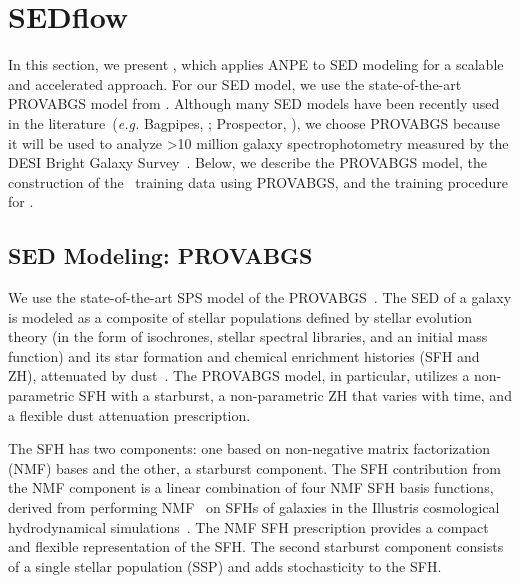 \section{SEDflow} \label{sec:sedflow}
In this section, we present \sedflow, which applies ANPE to SED modeling for a
scalable and accelerated approach.
For our SED model, we use the state-of-the-art PROVABGS model from
\cite{hahn2022}. 
Although many SED models have been recently used in the
literature~(\emph{e.g.} {\sc Bagpipes}, \citealt{carnall2018}; 
{\sc Prospector}, \citealt{leja2017, johnson2021}), we choose PROVABGS because
it will be used to analyze >10 million galaxy spectrophotometry measured by the
DESI Bright Galaxy Survey~\citep{ruiz-macias2021, hahn2022}.
Below, we describe the PROVABGS model, the construction of the
\sedflow~training data using PROVABGS, and the training procedure for \sedflow.

\subsection{SED Modeling: PROVABGS} \label{sec:provabgs}
We use the state-of-the-art SPS model of the
PROVABGS~\citep{hahn2022}. 
The SED of a galaxy is modeled as a composite of stellar populations defined by
stellar evolution theory (in the form of isochrones, stellar spectral
libraries, and an initial mass function) and its star
formation and chemical enrichment histories (SFH and ZH), attenuated by
dust~\citep[see][for a review]{walcher2011, conroy2013}. 
The PROVABGS model, in particular, utilizes a non-parametric SFH with a
starburst, a non-parametric ZH that varies with time, and a flexible dust
attenuation prescription.

The SFH has two components: one based on non-negative matrix factorization
(NMF) bases and the other, a starburst component.
The SFH contribution from the NMF component is a linear combination of four NMF
SFH basis functions, derived from performing NMF~\citep{lee1999, cichocki2009,
fevotte2011} on SFHs of galaxies in the Illustris cosmological hydrodynamical
simulations~\citep{vogelsberger2014, genel2014, nelson2015}.
The NMF SFH prescription provides a compact and flexible representation of the
SFH.
The second starburst component consists of a single stellar population (SSP)
and adds stochasticity to the SFH. 

